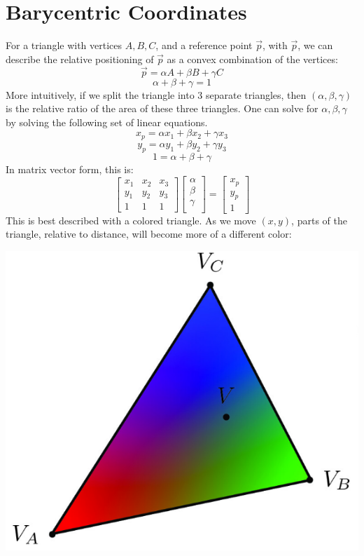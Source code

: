 \documentclass{article}
\begin{document}
\section{Barycentric Coordinates}
For a triangle with vertices $A, B, C$, and a reference point $\vec{p}$, with $\vec{p}$, we can describe the relative positioning of $\vec{p}$ as a convex combination of the vertices:
$$
\vec{p} = \alpha A + \beta B + \gamma C
$$
$$
\alpha + \beta + \gamma = 1
$$
More intuitively, if we split the triangle into 3 separate triangles, then $(\alpha, \beta, \gamma)$ is the relative ratio of the area of these three triangles. One can solve for $\alpha, \beta, \gamma$ by solving the following set of linear equations.
$$x_p = \alpha x_1 + \beta x_2 + \gamma x_3$$
$$y_p = \alpha y_1 + \beta y_2 + \gamma y_3$$
$$1 = \alpha + \beta + \gamma$$
In matrix vector form, this is:
$$
\begin{bmatrix}
x_1 & x_2 & x_3 \\
y_1 & y_2 & y_3 \\
1 & 1 & 1
\end{bmatrix}
\begin{bmatrix}
\alpha \\
\beta \\
\gamma \\
\end{bmatrix}
=
\begin{bmatrix}
x_p \\
y_p \\
1
\end{bmatrix}
$$
This is best described with a colored triangle. As we move $(x, y)$, parts of the triangle, relative to distance, will become more of a different color:
\begin{center}
    \includegraphics[]{task 4/triangle.png}
\end{center}
\end{document}
